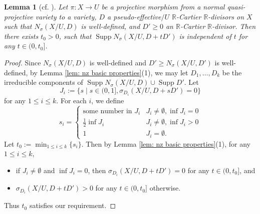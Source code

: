 \documentclass[11pt]{amsart}
\numberwithin{equation}{section}
\newcommand{\Rr}{\mathbb{R}}
\newcommand{\Supp}{\operatorname{Supp}}
\newtheorem{lem}[thm]{Lemma}
\theoremstyle{definition}
\theoremstyle{definition}
\theoremstyle{definition}
\begin{document}
\begin{lem}[{cf. \cite[Remark 2.4]{Has20a}}]\label{lem: has20a 2.4 rel ver}
Let $\pi: X\rightarrow U$ be a projective morphism from a normal quasi-projective variety to a variety, $D$ a pseudo-effective$/U$ $\Rr$-Cartier $\Rr$-divisors on $X$ such that $N_{\sigma}(X/U,D)$ is well-defined, and $D'\geq 0$ an $\Rr$-Cartier $\Rr$-divisor. Then there exists $t_0>0$, such that $\Supp N_{\sigma}(X/U,D+tD')$ is independent of $t$ for any $t\in (0,t_0]$.
\end{lem}
\begin{proof}
Since $N_{\sigma}(X/U,D)$ is well-defined and $D'\geq N_{\sigma}(X/U,D')$ is well-defined, by Lemma \ref{lem: nz basic properties}(1), we may let $D_1,\dots,D_k$ be the irreducible components of $\Supp N_{\sigma}(X/U,D)\cup\Supp D'$. Let $$J_i:=\{s\mid s\in (0,1],\sigma_{D_i}(X/U,D+sD')=0\}$$
for any $1\leq i\leq k$. For each $i$, we define
$$s_i=\begin{cases} 
      \text{some number in }J_i & J_i\not=\emptyset, \inf J_i=0 \\
      \frac{1}{2}\inf J_i & J_i\not=\emptyset, \inf J_i>0 \\
      1 & J_i=\emptyset. 
   \end{cases}
   $$
   Let $t_0:=\min_{1\leq i\leq k}\{s_i\}$. Then by Lemma \ref{lem: nz basic properties}(1), for any $1\leq i\leq k$, \begin{itemize}
       \item if $J_i\not=\emptyset$ and $\inf J_i=0$, then $\sigma_{D_i}(X/U,D+tD')=0$ for any $t\in (0,t_0]$, and
       \item $\sigma_{D_i}(X/U,D+tD')>0$ for any $t\in (0,t_0]$ otherwise.
   \end{itemize}
   Thus $t_0$ satisfies our requirement.
\end{proof}
\end{document}
